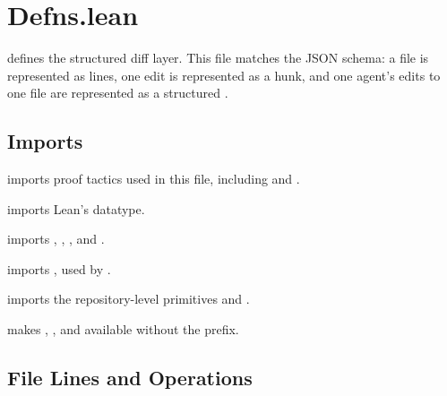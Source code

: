 \section{Defns.lean}

 defines the structured diff layer. This file matches the JSON
schema: a file is represented as lines, one edit is represented as a hunk, and
one agent's edits to one file are represented as a structured .

\subsection{Imports}

\begin{definition}
 imports proof tactics used in this file,
including  and .
\end{definition}

\begin{definition}
 imports Lean's  datatype.
\end{definition}

\begin{definition}
 imports ,
, , and .
\end{definition}

\begin{definition}
 imports , used
by .
\end{definition}

\begin{definition}
 imports the repository-level primitives
 and .
\end{definition}

\begin{definition}
 makes , , and 
available without the  prefix.
\end{definition}

\subsection{File Lines and Operations}

